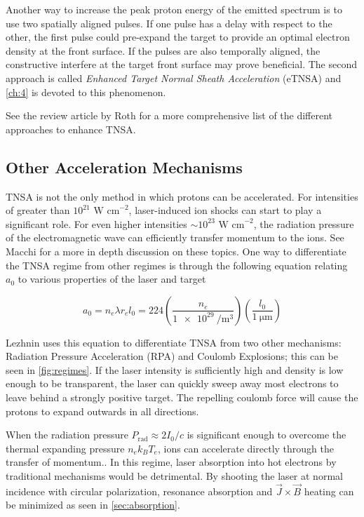 Another way to increase the peak proton energy of the emitted spectrum is to use two spatially aligned pulses. If one pulse has a delay with respect to the other, the first pulse could pre-expand the target to provide an optimal electron density at the front surface\cite{Ferri_2018_PoP}. If the pulses are also temporally aligned, the constructive interfere at the target front surface may prove beneficial\cite{Ferri_2019_Nat_Comm}. The second approach is called \emph{Enhanced Target Normal Sheath Acceleration} (eTNSA) and \cref{ch:4} is devoted to this phenomenon. 

See the review article by Roth\cite{Roth_2016_CERN_TNSA} for a more comprehensive list of the different approaches to enhance TNSA.

\subsection{Other Acceleration Mechanisms}
TNSA is not the only method in which protons can be accelerated. For intensities of greater than $10^{21} \text{ W cm}^{-2}$, laser-induced ion shocks can start to play a significant role\cite{Fuchs_2005_Nat}. For even higher intensities $\sim 10^{23} \text{ W cm}^{-2}$, the radiation pressure of the electromagnetic wave can efficiently transfer momentum to the ions\cite{Fuchs_2005_Nat}. See Macchi\cite{Macchi_2013_RevModPhys} for a more in depth discussion on these topics. One way to differentiate the TNSA regime from other regimes is through the following equation relating $a_0$ to various properties of the laser and target

\begin{equation}
	a_0 = n_e \lambda r_e l_0 = 224 \left(\frac{n_e}{\SI{1e29}{\per \meter \cubed}}\right) \left(\frac{l_0}{\SI{1}{\micro \meter}} \right) \label{eq:acc_regime}
\end{equation}

Lezhnin\cite{Lezhnin_2015_PoP} uses this equation to differentiate TNSA from two other mechanisms: Radiation Pressure Acceleration (RPA) and Coulomb Explosions; this can be seen in \cref{fig:regimes}. If the laser intensity is sufficiently high and density is low enough to be transparent, the laser can quickly sweep away most electrons to leave behind a strongly positive target. The repelling coulomb force will cause the protons to expand outwards in all directions.

When the radiation pressure $P_\text{rad} \approx 2 I_0 / c$ is significant enough to overcome the thermal expanding pressure $n_e k_B T_e$, ions can accelerate directly through the transfer of momentum.\cite{Macchi_2013_RevModPhys}. In this regime, laser absorption into hot electrons by traditional mechanisms would be detrimental. By shooting the laser at normal incidence with circular polarization, resonance absorption and $\vec{J} \times \vec{B}$ heating can be minimized as seen in \cref{sec:absorption}.

